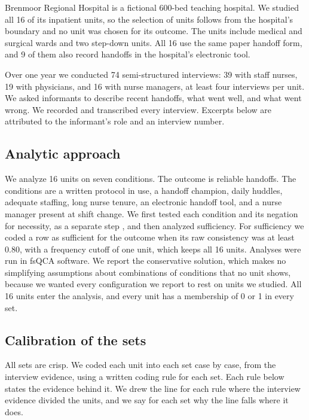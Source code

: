 \documentclass[12pt]{article}
\begin{document}
Brenmoor Regional Hospital is a fictional 600-bed teaching hospital. We studied all 16 of its inpatient units, so the selection of units follows from the hospital's boundary and no unit was chosen for its outcome. The units include medical and surgical wards and two step-down units. All 16 use the same paper handoff form, and 9 of them also record handoffs in the hospital's electronic tool.

Over one year we conducted 74 semi-structured interviews: 39 with staff nurses, 19 with physicians, and 16 with nurse managers, at least four interviews per unit. We asked informants to describe recent handoffs, what went well, and what went wrong. We recorded and transcribed every interview. Excerpts below are attributed to the informant's role and an interview number.

\subsection{Analytic approach}

We analyze 16 units on seven conditions. The outcome is reliable handoffs. The conditions are a written protocol in use, a handoff champion, daily huddles, adequate staffing, long nurse tenure, an electronic handoff tool, and a nurse manager present at shift change. We first tested each condition and its negation for necessity, as a separate step \citep{schneider2012}, and then analyzed sufficiency. For sufficiency we coded a row as sufficient for the outcome when its raw consistency was at least 0.80, with a frequency cutoff of one unit, which keeps all 16 units. Analyses were run in fsQCA software. We report the conservative solution, which makes no simplifying assumptions about combinations of conditions that no unit shows, because we wanted every configuration we report to rest on units we studied. All 16 units enter the analysis, and every unit has a membership of 0 or 1 in every set.

\subsection{Calibration of the sets}

All sets are crisp. We coded each unit into each set case by case, from the interview evidence, using a written coding rule for each set. Each rule below states the evidence behind it. We drew the line for each rule where the interview evidence divided the units, and we say for each set why the line falls where it does.
\end{document}
